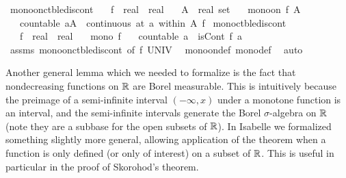 \documentclass[leqno]{article}
\theoremstyle{definition}
\begin{document}
\begin{isabellebody}
\isamarkupfalse%
\ mono{\isacharunderscore}on{\isacharunderscore}ctble{\isacharunderscore}discont{\isacharcolon}\isanewline
\ \ \ f\ {\isacharcolon}{\isacharcolon}\ {\isachardoublequoteopen}real\ {\isasymRightarrow}\ real{\isachardoublequoteclose}\isanewline
\ \ \ A\ {\isacharcolon}{\isacharcolon}\ {\isachardoublequoteopen}real\ set{\isachardoublequoteclose}\isanewline
\ \ \ {\isachardoublequoteopen}mono{\isacharunderscore}on\ f\ A{\isachardoublequoteclose}\isanewline
\ \ \ {\isachardoublequoteopen}countable\ {\isacharbraceleft}a{\isasymin}A{\isachardot}\ {\isasymnot}\ continuous\ {\isacharparenleft}at\ a\ within\ A{\isacharparenright}\ f{\isacharbraceright}{\isachardoublequoteclose}\isanewline
\isanewline
{}\isamarkupfalse%
\ mono{\isacharunderscore}ctble{\isacharunderscore}discont{\isacharcolon}\isanewline
\ \ \ f\ {\isacharcolon}{\isacharcolon}\ {\isachardoublequoteopen}real\ {\isasymRightarrow}\ real{\isachardoublequoteclose}\isanewline
\ \ \ {\isachardoublequoteopen}mono\ f{\isachardoublequoteclose}\isanewline
\ \ \ {\isachardoublequoteopen}countable\ {\isacharbraceleft}a{\isachardot}\ {\isasymnot}\ isCont\ f\ a{\isacharbraceright}{\isachardoublequoteclose}\isanewline
{}\isamarkupfalse%
\ assms\ mono{\isacharunderscore}on{\isacharunderscore}ctble{\isacharunderscore}discont\ {\isacharbrackleft}of\ f\ UNIV{\isacharbrackright}\ \isamarkupfalse%
\ mono{\isacharunderscore}on{\isacharunderscore}def\ mono{\isacharunderscore}def\ \isamarkupfalse%
\ auto%
\end{isabellebody}

\medskip

Another general lemma which we needed to formalize is the fact that nondecreasing functions on $\mathbb{R}$ are Borel measurable. This is intuitively because the preimage of a semi-infinite interval $(-\infty,x)$ under a monotone function is an interval, and the semi-infinite intervals generate the Borel $\sigma$-algebra on $\mathbb{R}$ (note they are a subbase for the open subsets of $\mathbb{R}$). In Isabelle we formalized something slightly more general, allowing application of the theorem when a function is only defined (or only of interest) on a subset of $\mathbb{R}$. This is useful in particular in the proof of Skorohod's theorem.

\medskip
\end{document}
